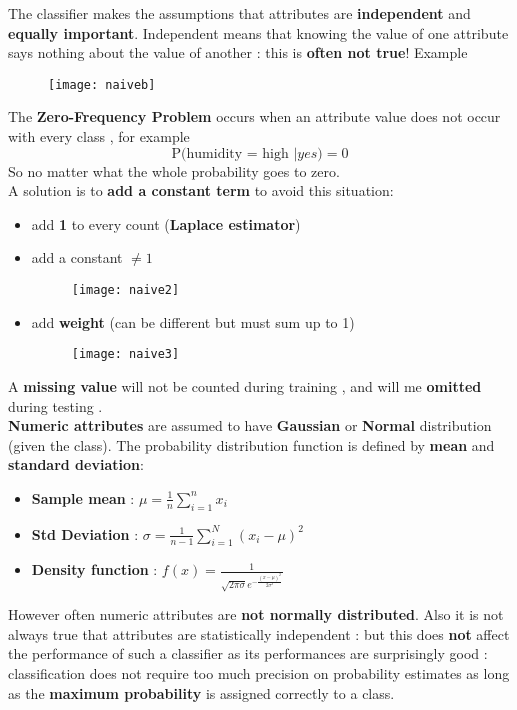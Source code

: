 The classifier makes the assumptions that attributes are \textbf{independent} and \textbf{equally important}. Independent means that knowing the value of one attribute says nothing about the value of another : this is \textbf{often not true}! 
Example
\begin{figure}[H]
  \centering
  \texttt{[image: naiveb]}
\end{figure}
The \textbf{Zero-Frequency Problem} occurs when  an attribute value does not occur with every class , for example $$ \text{P(humidity = high	}|yes)=0$$
So no matter what the whole probability goes to zero.\\
A solution is to \textbf{add a constant term } to avoid this situation:
\begin{itemize}
\item add \textbf{1} to every count (\textbf{Laplace estimator})
\item add a constant $\neq 1$
\begin{figure}[H]
  \centering
  \texttt{[image: naive2]}
\end{figure}
\item add \textbf{weight} (can be different but must sum up to 1)
\begin{figure}[H]
  \centering
  \texttt{[image: naive3]}
\end{figure}
\end{itemize}
A \textbf{missing value} will not be counted during training , and will me \textbf{omitted} during testing .\\
\textbf{Numeric attributes} are assumed to have \textbf{Gaussian} or \textbf{Normal} distribution (given the class). The probability distribution function is defined by \textbf{mean} and \textbf{standard deviation}:
\begin{itemize}
\item \textbf{Sample mean} : $\mu = \frac{1}{n} \sum \limits_{i=1}^{n} x_i$
\item \textbf{Std Deviation} : $\sigma = \frac{1}{n-1} \sum \limits_{i=1}^{N}(x_i - \mu)^2$
\item \textbf{Density function} : $f(x) = \frac{1}{\sqrt{2 \pi \sigma} e^{- \frac{(x-\mu)^2}{2\sigma ^2}}}$
\end{itemize}
However often numeric attributes are \textbf{not normally distributed}.
Also it is not always true that attributes are statistically independent : but this does \textbf{not} affect the performance of such a classifier as its performances are surprisingly good : classification does not require too much precision on probability estimates as long as the \textbf{maximum probability } is assigned correctly to a class.

